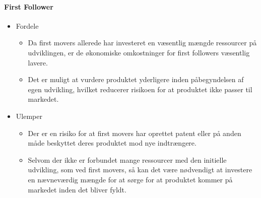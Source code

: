 \paragraph{First Follower}
\begin{itemize}
    \item Fordele
    \begin{itemize}
        \item Da first movers allerede har investeret en væsentlig mængde ressourcer på udviklingen, er de økonomiske omkostninger for first followers væsentlig lavere.
        \item Det er muligt at vurdere produktet yderligere inden påbegyndelsen af egen udvikling, hvilket reducerer risikoen for at produktet ikke passer til markedet.
    \end{itemize}
    \item Ulemper
    \begin{itemize}
        \item Der er en risiko for at first movers har oprettet patent eller på anden måde beskyttet deres produktet mod nye indtrængere.
        \item Selvom der ikke er forbundet mange ressourcer med den initielle udvikling, som ved first movers, så kan det være nødvendigt at investere en nævneværdig mængde for at sørge for at produktet kommer på markedet inden det bliver fyldt.
    \end{itemize}
\end{itemize}
